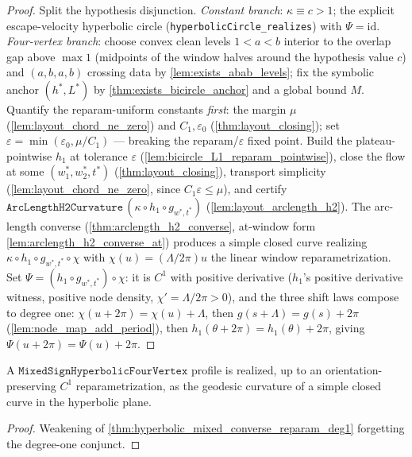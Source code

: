 \begin{proof}
  \leanok
  Split the hypothesis disjunction.  \emph{Constant branch}:
  $\kappa\equiv c>1$; the explicit escape-velocity hyperbolic circle
  (\texttt{hyperbolicCircle\_realizes}) with $\Psi=\mathrm{id}$.
  \emph{Four-vertex branch}: choose convex clean levels $1<a<b$ interior to
  the overlap gap above $\max 1$ (midpoints of the window halves around the
  hypothesis value $c$) and $(a,b,a,b)$ crossing data by
  \cref{lem:exists_abab_levels}; fix the symbolic anchor $(h^*,L^*)$ by
  \cref{thm:exists_bicircle_anchor} and a global bound $M$.  Quantify the
  reparam-uniform constants \emph{first}: the margin $\mu$
  (\cref{lem:layout_chord_ne_zero}) and $C_1,\varepsilon_0$
  (\cref{thm:layout_closing}); set
  $\varepsilon=\min(\varepsilon_0,\mu/C_1)$ — breaking the
  reparam/$\varepsilon$ fixed point.  Build the plateau-pointwise $h_1$ at
  tolerance $\varepsilon$ (\cref{lem:bicircle_L1_reparam_pointwise}), close
  the flow at some $(w_1^*,w_2^*,t^*)$ (\cref{thm:layout_closing}), transport
  simplicity (\cref{lem:layout_chord_ne_zero}, since
  $C_1\varepsilon\le\mu$), and certify
  $\texttt{ArcLengthH2Curvature}\,(\kappa\circ h_1\circ g_{w^*,t^*})$
  (\cref{lem:layout_arclength_h2}).  The arc-length converse
  (\cref{thm:arclength_h2_converse}, at-window form
  \cref{lem:arclength_h2_converse_at}) produces a simple closed curve
  realizing $\kappa\circ h_1\circ g_{w^*,t^*}\circ\chi$ with
  $\chi(u)=(\Lambda/2\pi)u$ the linear window reparametrization.  Set
  $\Psi=(h_1\circ g_{w^*,t^*})\circ\chi$: it is $C^1$ with positive
  derivative ($h_1$'s positive derivative witness, positive node density,
  $\chi'=\Lambda/2\pi>0$), and the three shift laws compose to degree one:
  $\chi(u+2\pi)=\chi(u)+\Lambda$, then $g(s+\Lambda)=g(s)+2\pi$
  (\cref{lem:node_map_add_period}), then
  $h_1(\theta+2\pi)=h_1(\theta)+2\pi$, giving
  $\Psi(u+2\pi)=\Psi(u)+2\pi$.
\end{proof}

\begin{corollary}
  \label{cor:hyperbolic_mixed_converse_family}
  A $\texttt{MixedSignHyperbolicFourVertex}$ profile is realized, up to an
  orientation-preserving $C^1$ reparametrization, as the geodesic curvature
  of a simple closed curve in the hyperbolic plane.
\end{corollary}

\begin{proof}
  \leanok
  Weakening of \cref{thm:hyperbolic_mixed_converse_reparam_deg1} forgetting
  the degree-one conjunct.
\end{proof}
